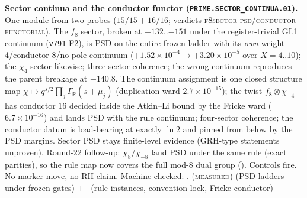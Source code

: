 \documentclass[11pt,a4paper]{article}
\theoremstyle{definition}
\begin{document}
\par\smallskip\noindent\textbf{Sector continua and the conductor
functor (\texttt{PRIME.SECTOR\_CONTINUA.01}).}
One module from two probes ($15/15+16/16$; verdicts
\textsc{f8sector-psd}/\textsc{conductor-functorial}).  The $f_8$
sector, broken at $-132..{-151}$ under the register-trivial GL1
continuum (\texttt{v791} F2), is PSD on the entire frozen ladder
with its \emph{own} weight-4/conductor-8/no-pole continuum
($+1.52\times10^{-4}\to+3.20\times10^{-5}$ over $X=4..10$); the
$\chi_4$ sector likewise; three-sector coherence; the wrong
continuum reproduces the parent breakage at $-140.8$.  The continuum
assignment is one closed structure map
$\chi\mapsto q^{s/2}\prod_j\Gamma_{\mathbb R}(s+\mu_j)$ (duplication
ward $2.7\times10^{-15}$); the twist $f_8\otimes\chi_{-4}$ has
conductor $16$ decided inside the Atkin--Li bound by the Fricke ward
($6.7\times10^{-16}$) and lands PSD with the rule continuum;
four-sector coherence; the conductor datum is load-bearing at
exactly $\ln 2$ and pinned from below by the PSD margins.  Sector
PSD stays finite-level evidence (GRH-type statements unproven).
Round-22 follow-up: $\chi_8/\chi_{-8}$ land PSD under the same
rule (exact parities), so the rule map now covers the full mod-8
dual group ().
Controls fire.  No marker move, no RH claim.
Machine-checked: .
(\textsc{measured}) (PSD ladders under frozen gates) $+$ \mE\
(rule instances, convention lock, Fricke conductor)
\par\smallskip
\end{document}
